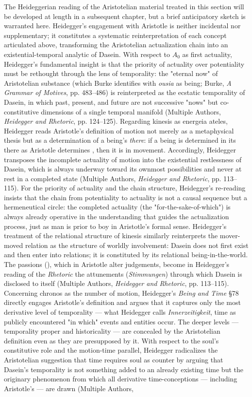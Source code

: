 The Heideggerian reading of the Aristotelian material treated in this section will be developed at length in a subsequent chapter, but a brief anticipatory sketch is warranted here. Heidegger's engagement with Aristotle is neither incidental nor supplementary; it constitutes a systematic reinterpretation of each concept articulated above, transforming the Aristotelian actualization chain into an existential-temporal analytic of Dasein. With respect to $A_0$ as first actuality, Heidegger's fundamental insight is that the priority of actuality over potentiality must be rethought through the lens of temporality: the "eternal now" of Aristotelian substance (which Burke identifies with \textit{ousia} as being; Burke, \textit{A Grammar of Motives}, pp. 483--486) is reinterpreted as the ecstatic temporality of Dasein, in which past, present, and future are not successive "nows" but co-constitutive dimensions of a single temporal manifold (Multiple Authors, \textit{Heidegger and Rhetoric}, pp. 124--125). Regarding kinesis as energeia ateles, Heidegger reads Aristotle's definition of motion not merely as a metaphysical thesis but as a determination of a being's \textit{there}: if a being is determined in its there as Aristotle determines , then it is in movement. Accordingly, Heidegger transposes the incomplete actuality of motion into the existential restlessness of Dasein, which is always underway toward its ownmost possibilities and never at rest in a completed state (Multiple Authors, \textit{Heidegger and Rhetoric}, pp. 113--115). For the priority of actuality and the chain structure, Heidegger's re-reading insists that the chain from potentiality to actuality is not a causal sequence but a hermeneutical circle: the completed actuality (the "for-the-sake-of-which") is always already operative in the understanding that guides the actualization process, just as man is prior to boy in Aristotle's formal sense. Heidegger's treatment of the relational structure of kinesis similarly reinterprets the mover-moved relation as the structure of worldly involvement: Dasein does not first exist and then enter into relations; it is constituted by its relational being-in-the-world. The passions (), which in Aristotle alter judgements, become in Heidegger's reading of the \textit{Rhetoric} the attunements (\textit{Stimmungen}) through which Dasein is disclosed to itself (Multiple Authors, \textit{Heidegger and Rhetoric}, pp. 113--115). Concerning chronos as the number of motion, Heidegger's \textit{Being and Time} §78 directly engages Aristotle's definition and argues that it captures only the most derivative level of temporality --- what Heidegger calls \textit{Innerzeitigkeit}, time as publicly encountered "in which" events and entities occur. The deeper levels --- temporality proper and historicality --- are concealed by the Aristotelian definition even as they are presupposed by it. With respect to the soul's constitutive role and the motion-time parallel, Heidegger radicalizes the Aristotelian suggestion that time requires soul as counter by arguing that Dasein's temporality is not something added to an already existing time but the originary phenomenon from which all derivative time-conceptions --- including Aristotle's --- are drawn (Multiple Authors, 